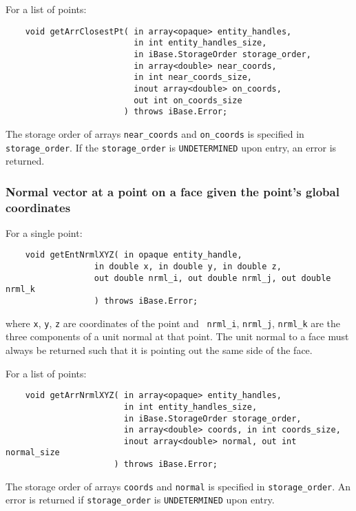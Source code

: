 \documentclass{article}
\begin{document}
\hspace{-16pt}For a list of points:

\begin{verbatim}
    void getArrClosestPt( in array<opaque> entity_handles, 
                          in int entity_handles_size,
                          in iBase.StorageOrder storage_order,
                          in array<double> near_coords, 
                          in int near_coords_size,
                          inout array<double> on_coords, 
                          out int on_coords_size
                        ) throws iBase.Error;
\end{verbatim}
The storage order of arrays {\tt near\_coords} and {\tt on\_coords} is
specified in {\tt storage\_order}. If the {\tt storage\_order} is {\tt UNDETERMINED} upon entry, an error is returned.

\subsubsection{Normal vector at a point on a face given the 
point's global coordinates}
For a single point:

\begin{verbatim}
    void getEntNrmlXYZ( in opaque entity_handle, 
                  in double x, in double y, in double z,
                  out double nrml_i, out double nrml_j, out double nrml_k
                  ) throws iBase.Error;
\end{verbatim}
where {\tt x}, {\tt y}, {\tt z} are coordinates of the point and {\tt
  nrml\_i}, {\tt nrml\_j}, {\tt nrml\_k}
are the three components of a unit normal at that point. The unit normal to 
a face must always be returned such that it is pointing out the 
same side of the face.

\hspace{-16pt}For a list of points:

\begin{verbatim}
    void getArrNrmlXYZ( in array<opaque> entity_handles, 
                        in int entity_handles_size,
                        in iBase.StorageOrder storage_order,
                        in array<double> coords, in int coords_size,
                        inout array<double> normal, out int normal_size
                      ) throws iBase.Error;
\end{verbatim}
The storage order of arrays {\tt coords} and {\tt normal} is specified in
{\tt storage\_order}. An error is returned if {\tt storage\_order}
 is {\tt UNDETERMINED} upon entry.
 
\end{document}
